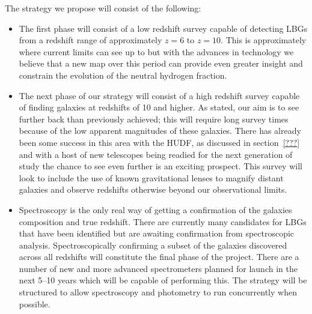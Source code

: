 	The strategy we propose will consist of the following:
	\begin{itemize}
		\item The first phase will consist of a low redshift survey capable of detecting LBGs from a redshift range of approximately $z=6$ to $z=10$. This is approximately where current limits can see up to but with the advances in technology we believe that a new map over this period can provide even greater insight and constrain the evolution of the neutral hydrogen fraction.
		\item The next phase of our strategy will consist of a high redshift survey capable of finding galaxies at redshifts of 10 and higher. As stated, our aim is to see further back than previously achieved; this will require long survey times because of the low apparent magnitudes of these galaxies. There has already been some success in this area with the HUDF, as discussed in section~\ref{???} and with a host of new telescopes being readied for the next generation of study the chance to see even further is an exciting prospect. This survey will look to include the use of known gravitational lenses to magnify distant galaxies and observe redshifts otherwise beyond our observational limits.
		\item Spectroscopy is the only real way of getting a confirmation of the galaxies composition and true redshift. There are currently many candidates for LBGs that have been identified but are awaiting confirmation from spectroscopic analysis. Spectroscopically confirming a subset of the galaxies discovered across all redshifts will constitute the final phase of the project. There are a number of new and more advanced spectrometers planned for launch in the next 5--10 years which will be capable of performing this. The strategy will be structured to allow spectroscopy and photometry to run concurrently when possible.
	\end{itemize}
